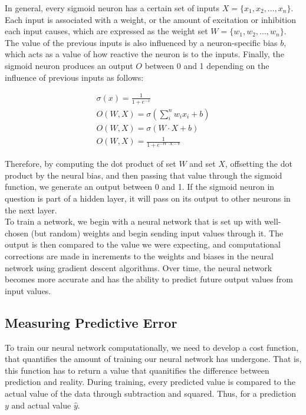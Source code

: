 \documentclass[11pt]{article}
\begin{document}
In general, every sigmoid neuron has a certain set of inputs $X=\{x_1, x_2, \hdots , x_n\}$. Each input is associated with a weight, or the amount of excitation or inhibition each input causes, which are expressed as the weight set $W=\{w_1, w_2, \hdots , w_n\}$. The value of the previous inputs is also influenced by a neuron-specific bias $b$, which acts as a value of how reactive the neuron is to the inputs. Finally, the sigmoid neuron produces an output $O$ between 0 and 1 depending on the influence of previous inputs as follows:

\begin{gather*}
    \sigma (x)=\frac{1}{1+e^{-x}}\\
    O(W, X)=\sigma \left(\sum_{i}^{n} w_{i}x_{i} + b\right)\\
    O(W, X)=\sigma \left(W\cdot X + b\right)\\
    O(W, X)=\frac{1}{1+e^{-W\cdot X - b}}
\end{gather*}

Therefore, by computing the dot product of set $W$ and set $X$, offsetting the dot product by the neural bias, and then passing that value through the sigmoid function, we generate an output between 0 and 1. If the sigmoid neuron in question is part of a hidden layer, it will pass on its output to other neurons in the next layer. \\

To train a network, we begin with a neural network that is set up with well-chosen (but random) weights and begin sending input values through it. The output is then compared to the value we were expecting, and computational corrections are made in increments to the weights and biases in the neural network using gradient descent algorithms. Over time, the neural network becomes more accurate and has the ability to predict future output values from input values.

\subsection{Measuring Predictive Error}

To train our neural network computationally, we need to develop a cost function, that quantifies the amount of training our neural network has undergone. That is, this function has to return a value that quanitifies the difference between prediction and reality. During training, every predicted value is compared to the actual value of the data through subtraction and squared. Thus, for a prediction $y$ and actual value $\hat y$.
\end{document}
